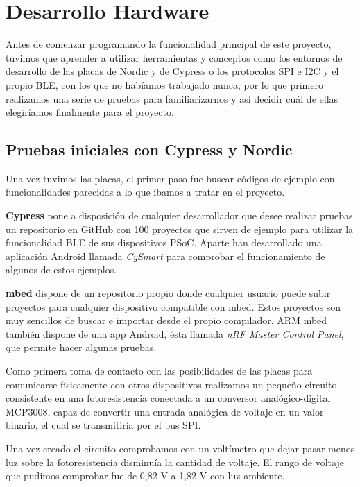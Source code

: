 
\cleardoublepage

\chapter{Desarrollo Hardware}
\label{makereference4}

Antes de comenzar programando la funcionalidad principal de este proyecto, tuvimos que aprender a utilizar herramientas y conceptos como los entornos de desarrollo de las placas de Nordic y de Cypress o los protocolos SPI e I2C y el propio BLE, con los que no habíamos trabajado nunca, por lo que primero realizamos una serie de pruebas para familiarizarnos y así decidir cuál de ellas elegiríamos finalmente para el proyecto.

\section{Pruebas iniciales con Cypress y Nordic}
\label{makereference4.1}

Una vez tuvimos las placas, el primer paso fue buscar códigos de ejemplo con funcionalidades parecidas a lo que íbamos a tratar en el proyecto.

\textbf{Cypress} pone a disposición de cualquier desarrollador que desee realizar pruebas un repositorio en GitHub con 100 proyectos que sirven de ejemplo para utilizar la funcionalidad BLE de sus dispositivos PSoC. Aparte han desarrollado una aplicación Android llamada \textit{CySmart} para comprobar el funcionamiento de algunos de estos ejemplos.

\textbf{mbed} dispone de un repositorio propio donde cualquier usuario puede subir proyectos para cualquier dispositivo compatible con mbed. Estos proyectos son muy sencillos de buscar e importar desde el propio compilador. ARM mbed también dispone de una app Android, ésta llamada \textit{nRF Master Control Panel}, que permite hacer algunas pruebas.

Como primera toma de contacto con las posibilidades de las placas para comunicarse físicamente con otros dispositivos realizamos un pequeño circuito consistente en una fotoresistencia conectada a un conversor analógico-digital MCP3008, capaz de convertir una entrada analógica de voltaje en un valor binario, el cual se transmitiría por el bus SPI.

Una vez creado el circuito comprobamos con un voltímetro que dejar pasar menos luz sobre la fotoresistencia disminuía la cantidad de voltaje. El rango de voltaje que pudimos comprobar fue de 0,82 V a 1,82 V con luz ambiente.

